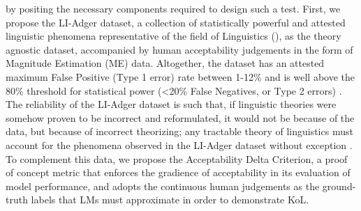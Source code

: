 \DIFaddend by positing the necessary components required to design such a test.  First, we propose the LI-Adger dataset, a collection of statistically powerful and attested linguistic phenomena representative of the field of Linguistics (\DIFdelbegin {}\DIFdelend \DIFaddbegin {}\DIFaddend ), as the theory agnostic dataset, accompanied by human acceptability judgements in the form of Magnitude Estimation (ME) data.  Altogether, the dataset has an attested maximum False Positive (Type 1 error) rate between 1-12\% and is well above the 80\% threshold for statistical power (<20\% False Negatives, or Type 2 errors) \DIFdelbegin {}\DIFdelend \DIFaddbegin {}\DIFaddend .  The reliability of the LI-Adger dataset is such that, if \DIFaddbegin {}\DIFaddend linguistic theories were somehow proven to be incorrect and reformulated, it would not be because of the data, but because of incorrect theorizing; any tractable theory of linguistics must account for the phenomena observed in the LI-Adger dataset without exception \DIFdelbegin {}\DIFdelend \DIFaddbegin {}\DIFaddend .  To complement this data, we propose the Acceptability Delta Criterion, a proof of concept metric that enforces the gradience of acceptability in its evaluation of model performance, and adopts the continuous human judgements as the ground-truth labels that LMs must approximate in order to demonstrate KoL.

